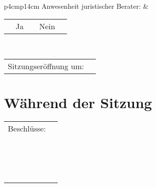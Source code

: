 \documentclass{sasbase}
\begin{document}
\vspace{3mm}
\begin{tabular}{p{4cm}p{14cm}}
    Anwesenheit juristischer Berater: &
    \begin{tabular}[t]{p{0.5cm}p{5cm}p{1cm}p{0.5cm}p{5cm}}
        \kreis & Ja & \kreis & Nein  \\
    \end{tabular}
    \\
\end{tabular}

\begin{tabular}{p{4cm}p{14cm}}
    Sitzungser\"{o}ffnung um: & \dotfill \\
\end{tabular}

\vspace*{-5mm}
\section{W\"{a}hrend der Sitzung}
\vspace*{5mm}

\vspace{3mm}
\begin{tabular}{p{4cm}p{14cm}}
    Beschlüsse: & \dotfill \\
    & \dotfill \\
    & \dotfill \\
    & \dotfill \\
    & \dotfill \\
    & \dotfill \\
    & \dotfill \\
    & \dotfill \\
    & \dotfill \\
    & \dotfill \\
    & \dotfill \\
    & \dotfill \\
    & \dotfill \\
    & \dotfill \\
    & \dotfill \\
    & \dotfill \\
    & \dotfill \\
\end{tabular}
\end{document}
